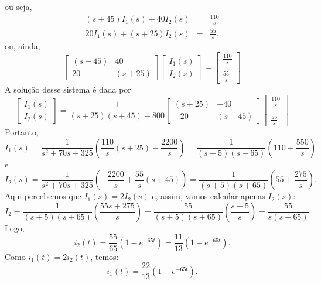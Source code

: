ou seja,
\begin{eqnarray*}
\left(s+45\right) I_1(s)+40I_2(s)&=&\frac{110}{s}\\
20I_1(s)+\left(s+25\right)I_2(s)&=&\frac{55}{s} .
\end{eqnarray*}
ou, ainda,
\begin{equation*}
\left[\begin{array}{cc}  \left(s+45\right) &40\\20& \left(s+25\right) \end{array}\right]\left[\begin{array}{c}I_1(s)\\I_2(s)\end{array}\right]=\left[\begin{array}{c}\frac{110}{s}\\ \\
\frac{55}{s}\end{array}\right]
\end{equation*}
A solução desse sistema é dada por
\begin{equation*}
\left[\begin{array}{c}I_1(s)\\I_2(s)\end{array}\right]=\frac{1}{(s+25)(s+45)-800}\left[\begin{array}{cc}  \left(s+25\right) &-40\\-20& \left(s+45\right) \end{array}\right]\left[\begin{array}{c}\frac{110}{s}\\ \\
\frac{55}{s}\end{array}\right]
\end{equation*}
Portanto,
\begin{equation}
I_1(s)=\frac{1}{s^2+70s+325}\left(\frac{110}{s}(s+25)-\frac{2200}{s}\right)=\frac{1}{(s+5)(s+65)}\left(110+\frac{550}{s}\right)
\end{equation}
e
\begin{equation}
I_2(s)=\frac{1}{s^2+70s+325}\left(-\frac{2200}{s}+\frac{55}{s}(s+45)\right)=\frac{1}{(s+5)(s+65)}\left(55+\frac{275}{s}\right).
\end{equation}
Aqui percebemos que $I_1(s)=2I_2(s)$ e, assim, vamos calcular apenas $I_2(s)$: 
\begin{equation}
I_2=\frac{1}{(s+5)(s+65)}\left(\frac{55s+275}{s}\right)=\frac{55}{(s+5)(s+65)}\left(\frac{s+5}{s}\right)=\frac{55}{s(s+65)}.
\end{equation}
Logo,
\begin{equation}
i_2(t)=\frac{55}{65}\left(1-e^{-65t}\right)=\frac{11}{13}\left(1-e^{-65t}\right).
\end{equation}
Como $i_1(t)=2i_2(t)$, temos:
\begin{equation}
i_1(t)=\frac{22}{13}\left(1-e^{-65t}\right).
\end{equation}



